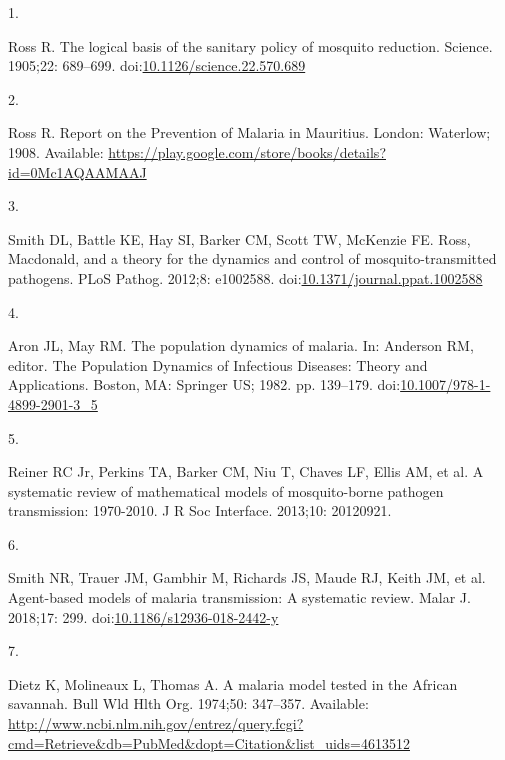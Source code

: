 \documentclass[
]{book}
\newlength{\cslhangindent}
\newlength{\csllabelwidth}
\newlength{\cslentryspacingunit} %
\newenvironment{CSLReferences}[2] %
 {%
  \setlength{\parindent}{0pt}
  \ifodd #1
  \let\oldpar\par
  \def\par{\hangindent=\cslhangindent\oldpar}
  \fi
  \setlength{\parskip}{#2\cslentryspacingunit}
 }%
 {}
\newcommand{\CSLLeftMargin}[1]{\parbox[t]{\csllabelwidth}{#1}}
\newcommand{\CSLRightInline}[1]{\parbox[t]{\linewidth - \csllabelwidth}{#1}\break}
\begin{document}
\hypertarget{refs}{}
\begin{CSLReferences}{0}{0}
\leavevmode{}%
\CSLLeftMargin{1. }%
\CSLRightInline{Ross R. The logical basis of the sanitary policy of mosquito reduction. Science. 1905;22: 689--699. doi:\href{https://doi.org/10.1126/science.22.570.689}{10.1126/science.22.570.689}}

\leavevmode{}%
\CSLLeftMargin{2. }%
\CSLRightInline{Ross R. Report on the {Prevention} of {Malaria} in {Mauritius}. {London}: {Waterlow}; 1908. Available: \url{https://play.google.com/store/books/details?id=0Mc1AQAAMAAJ}}

\leavevmode{}%
\CSLLeftMargin{3. }%
\CSLRightInline{Smith DL, Battle KE, Hay SI, Barker CM, Scott TW, McKenzie FE. Ross, {Macdonald}, and a theory for the dynamics and control of mosquito-transmitted pathogens. PLoS Pathog. 2012;8: e1002588. doi:\href{https://doi.org/10.1371/journal.ppat.1002588}{10.1371/journal.ppat.1002588}}

\leavevmode{}%
\CSLLeftMargin{4. }%
\CSLRightInline{Aron JL, May RM. The population dynamics of malaria. In: Anderson RM, editor. The {Population Dynamics} of {Infectious Diseases}: {Theory} and {Applications}. {Boston, MA}: {Springer US}; 1982. pp. 139--179. doi:\href{https://doi.org/10.1007/978-1-4899-2901-3_5}{10.1007/978-1-4899-2901-3\_5}}

\leavevmode{}%
\CSLLeftMargin{5. }%
\CSLRightInline{Reiner RC Jr, Perkins TA, Barker CM, Niu T, Chaves LF, Ellis AM, et al. A systematic review of mathematical models of mosquito-borne pathogen transmission: 1970-2010. J R Soc Interface. 2013;10: 20120921. }

\leavevmode{}%
\CSLLeftMargin{6. }%
\CSLRightInline{Smith NR, Trauer JM, Gambhir M, Richards JS, Maude RJ, Keith JM, et al. Agent-based models of malaria transmission: {A} systematic review. Malar J. 2018;17: 299. doi:\href{https://doi.org/10.1186/s12936-018-2442-y}{10.1186/s12936-018-2442-y}}

\leavevmode{}%
\CSLLeftMargin{7. }%
\CSLRightInline{Dietz K, Molineaux L, Thomas A. A malaria model tested in the {African} savannah. Bull Wld Hlth Org. 1974;50: 347--357. Available: \url{http://www.ncbi.nlm.nih.gov/entrez/query.fcgi?cmd=Retrieve\&db=PubMed\&dopt=Citation\&list_uids=4613512}}


\end{CSLReferences}
\end{document}
